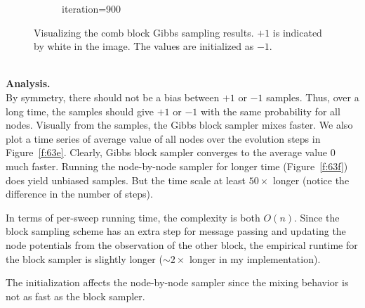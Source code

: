\documentclass{article}
\begin{document}
\begin{figure}[h]
\begin{subfigure}[t]{0.18\textwidth}
\vspace{-0.6cm}
\caption{iteration=900}
\end{subfigure}\hspace{0.01\textwidth}
\caption{Visualizing the comb block Gibbs sampling results. $+1$ is indicated by white in the image. The values are initialized as $-1$.}
\label{f:63d}
\end{figure}
%
\\

\noindent
\textbf{Analysis.}
\\

\noindent
By symmetry, there should not be a bias between $+1$ or $-1$ samples.
%
Thus, over a long time, the samples should give $+1$ or $-1$ with the same probability for all nodes.
%
Visually from the samples, the Gibbs block sampler mixes faster.
%
We also plot a time series of average value of all nodes over the evolution steps in Figure~\ref{f:63e}.
%
Clearly, Gibbs block sampler converges to the average value 0 much faster.
%
Running the node-by-node sampler for longer time (Figure~\ref{f:63f}) does yield unbiased samples.
%
But the time scale at least $50\times$ longer (notice the difference in the number of steps).
%

In terms of per-sweep running time, the complexity is both $O(n)$. Since the block sampling scheme has
an extra step for message passing and updating the node potentials from the observation of the other block,
the empirical runtime for the block sampler is slightly longer ($\sim 2\times$ longer in my implementation).

The initialization affects the node-by-node sampler since the mixing behavior is not as fast as the block sampler.
\\
\end{document}

